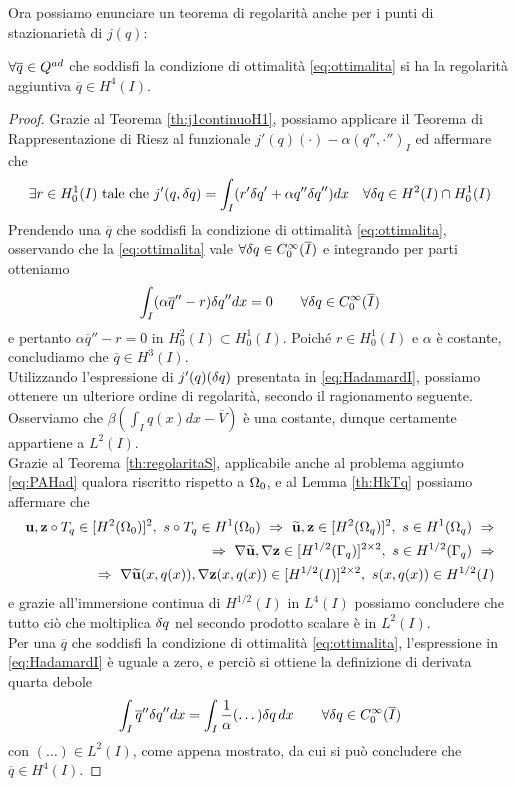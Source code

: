 Ora possiamo enunciare un teorema di regolarità anche per i punti di stazionarietà di $j(q)$:
\begin{teor}
	$\forall \overline{q}\in Q^{ad}$ che soddisfi la condizione di ottimalità \eqref{eq:ottimalita} si ha la regolarità aggiuntiva $\overline{q}\in H^4(I)$.
\label{th:regolaritaq}
\end{teor}
\begin{proof}
Grazie al Teorema \ref{th:j1continuoH1}, possiamo applicare il Teorema di Rappresentazione di Riesz al funzionale $j'(q)(\cdot)-\alpha(q'',\cdot'')_I$ ed affermare che
$$\exists r\in H^1_0(I)\text{ tale che } j'(q,{\delta q})=\int_I(r'{\delta q}'+\alpha q''{\delta q}'')dx \quad\forall{\delta q}\in H^2(I)\cap H^1_0(I)$$
Prendendo una $\overline{q}$ che soddisfi la condizione di ottimalità \eqref{eq:ottimalita}, osservando che la \eqref{eq:ottimalita} vale $\forall {\delta q} \in C_0^\infty(\overline{I})$ e integrando per parti otteniamo
$$ \int_I(\alpha \overline{q}'' - r){\delta q}'' dx = 0 \qquad\forall{\delta q} \in C_0^\infty(\overline{I})$$
e pertanto $\alpha \overline{q}'' - r=0$ in $H^2_0(I)\subset H^1_0(I)$. Poich\'e $r\in H^1_0(I)$ e $\alpha$ è costante, concludiamo che $\overline{q}\in H^3(I)$.\\

Utilizzando l'espressione di $j'(q)({\delta q})$ presentata in \eqref{eq:HadamardI}, possiamo ottenere un ulteriore ordine di regolarità, secondo il ragionamento seguente.\\
Osserviamo che $\beta(\int_Iq(x)dx - \overline{V})$ è una costante, dunque certamente appartiene a $L^2(I)$.\\
Grazie al Teorema \ref{th:regolaritaS}, applicabile anche al problema aggiunto \eqref{eq:PAHad} qualora riscritto rispetto a ${\Omega_0}$, e al Lemma \ref{th:HkTq} possiamo affermare che
\begin{equation*}\begin{split}
\u,\z\circ T_q\in [H^2(\O)]^2,\ s\circ T_q\in H^1(\O)\ \Rightarrow\ \widetilde{\u},\z\in [H^2(\Oq)]^2,\ s\in H^1(\Oq)\ \Rightarrow\\
\Rightarrow\ \nabla\widetilde{\u},\nabla\z\in [H^{1/2}(\Gamma_q)]^{2\times2},\ s\in H^{1/2}(\Gamma_q)\ \Rightarrow\\
\Rightarrow\ \nabla\widetilde{\u}(x,q(x)),\nabla\z(x,q(x))\in [H^{1/2}(I)]^{2\times2},\ s(x,q(x))\in H^{1/2}(I)
\end{split}\end{equation*}
e grazie all'immersione continua di $H^{1/2}(I)$ in $L^4(I)$ possiamo concludere che tutto ciò che moltiplica ${\delta q}$ nel secondo prodotto scalare è in $L^2(I)$.\\
Per una $\overline{q}$ che soddisfi la condizione di ottimalità \eqref{eq:ottimalita}, l'espressione in \eqref{eq:HadamardI} è uguale a zero, e perciò si ottiene la definizione di derivata quarta debole
$$ \int_I\overline{q}''{\delta q}'' dx = \int_I \frac{1}{\alpha}(\dots) {\delta q}\, dx \qquad \forall {\delta q}\in C^\infty_0(\overline{I})$$
con $(\dots)\in L^2(I)$, come appena mostrato, da cui si può concludere che $\overline{q}\in H^4(I)$.
\end{proof}